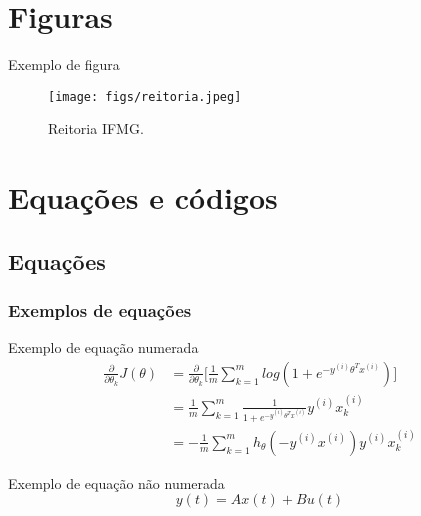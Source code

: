 \documentclass[table,xcolor=table]{IFMG-beamer}
\begin{document}
\section{Figuras}

\begin{frame}{Exemplo de figura} 

\begin{figure}
\centering
\caption{Reitoria IFMG.}
\texttt{[image: figs/reitoria.jpeg]}

\end{figure}

\end{frame}

\section{Equações e códigos}
\subsection{Equações}
\begin{frame}
\frametitle{Exemplos de equações}


\begin{block}{Exemplo de equação numerada}
\begin{align}
    \frac{\partial}{\partial \theta_k}J(\theta) 
        &= \frac{\partial}{\partial \theta_k}\Bigg[\frac{1}{m}\sum_{k=1}^m log(1+e^{-y^{(i)}\theta^Tx^{(i)}})\Bigg] \\
        &= \frac{1}{m}\sum_{k=1}^m \frac{1}{1+e^{-y^{(i)}\theta^Tx^{(i)}}}y^{(i)}x_k^{(i)} \\
        &= -\frac{1}{m}\sum_{k=1}^m h_\theta(-y^{(i)}x^{(i)})y^{(i)}x_k^{(i)}        
\end{align}
\end{block}
\begin{block}{Exemplo de equação não numerada}
    \begin{equation*}
        y(t) = Ax(t) + Bu(t)
    \end{equation*}
\end{block}

\end{frame}
\end{document}
